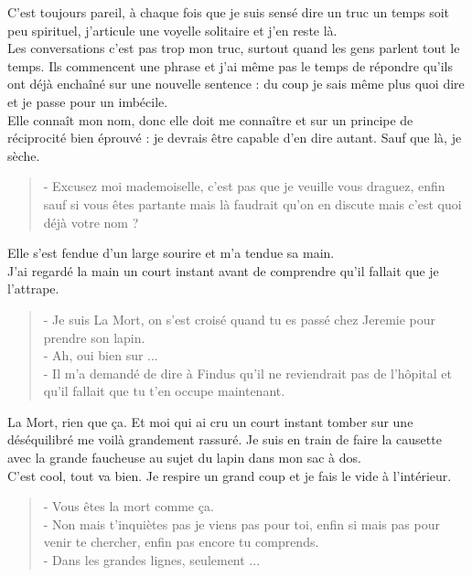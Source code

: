 C'est toujours pareil, à chaque fois que je suis sensé dire un truc un temps soit peu spirituel, j'articule une voyelle solitaire et j'en reste là. \\
Les conversations c'est pas trop mon truc, surtout quand les gens parlent tout le temps. Ils commencent une phrase et j'ai même pas le temps de répondre qu'ils ont déjà enchaîné sur une nouvelle sentence : du coup je sais même plus quoi dire et je passe pour un imbécile. \\
Elle connaît mon nom, donc elle doit me connaître et sur un principe de réciprocité bien éprouvé : je devrais être capable d'en dire autant. Sauf que là, je sèche. \\

\begin{quote}
- Excusez moi mademoiselle, c'est pas que je veuille vous draguez, enfin sauf si vous êtes partante mais là faudrait qu'on en discute mais c'est quoi déjà votre nom ?
\end{quote}

Elle s'est fendue d'un large sourire et m'a tendue sa main. \\
J'ai regardé la main un court instant avant de comprendre qu'il fallait que je l'attrape. \\

\begin{quote}
- Je suis La Mort, on s'est croisé quand tu es passé chez Jeremie pour prendre son lapin. \\
- Ah, oui bien sur ... \\
- Il m'a demandé de dire à Findus qu'il ne reviendrait pas de l’hôpital et qu'il fallait que tu t'en occupe maintenant. \\
\end{quote}

La Mort, rien que ça. Et moi qui ai cru un court instant tomber sur une déséquilibré me voilà grandement rassuré. Je suis en train de faire la causette avec la grande faucheuse au sujet du lapin dans mon sac à dos. \\
C'est cool, tout va bien. Je respire un grand coup et je fais le vide à l'intérieur. \\

\begin{quote}
- Vous êtes la mort comme ça. \\
- Non mais t’inquiètes pas je viens pas pour toi, enfin si mais pas pour venir te chercher, enfin pas encore tu comprends. \\
- Dans les grandes lignes, seulement ... \\
\end{quote}
